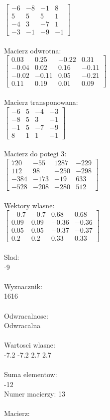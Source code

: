 \documentclass[a4paper,12pt]{article}
\begin{document}
$\begin{bmatrix} -6&-8&-1&8\\5&5&5&1\\-4&3&-7&1\\-3&-1&-9&-1 \end{bmatrix}$
\\
\\
Macierz odwrotna:\\

$\begin{bmatrix} 0.03&0.25&-0.22&0.31\\-0.04&0.02&0.16&-0.11\\-0.02&-0.11&0.05&-0.21\\0.11&0.19&0.01&0.09 \end{bmatrix}$
\\
\\
Macierz transponowana:\\

$\begin{bmatrix} -6&5&-4&-3\\-8&5&3&-1\\-1&5&-7&-9\\8&1&1&-1 \end{bmatrix}$
\\
\\
Macierz do potegi 3:\\

$\begin{bmatrix} 720&-55&1287&-229\\112&98&-250&-298\\-384&-173&-19&633\\-528&-208&-280&512 \end{bmatrix}$
\\
\\
Wektory wlasne:\\

$\begin{bmatrix} -0.7&-0.7&0.68&0.68\\0.09&0.09&-0.36&-0.36\\0.05&0.05&-0.37&-0.37\\0.2&0.2&0.33&0.33 \end{bmatrix}$
\\
\\
Slad:\\
-9
\\
\\
Wyznacznik:\\
1616
\\
\\
Odwracalnosc:\\
Odwracalna
\\
\\
Wartosci wlasne:\\
-7.2 -7.2 2.7 2.7
\\
\\
Suma elementow:\\
-12
\\
\newpage
Numer macierzy:
13
\\
\\
Macierz:\\
\end{document}
